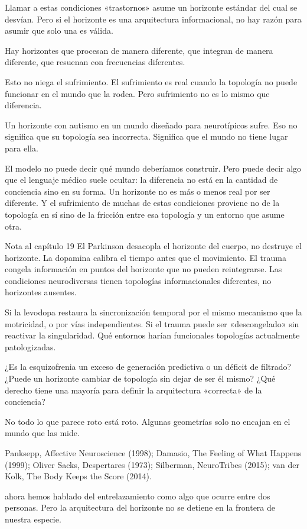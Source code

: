\noindent Llamar a estas condiciones «trastornos» asume un horizonte estándar del cual se desvían. Pero si el horizonte es una arquitectura informacional, no hay razón para asumir que solo una es válida.

Hay horizontes que procesan de manera diferente, que integran de manera diferente, que resuenan con frecuencias diferentes.

Esto no niega el sufrimiento. El sufrimiento es real cuando la topología no puede funcionar en el mundo que la rodea. Pero sufrimiento no es lo mismo que diferencia.

Un horizonte con autismo en un mundo diseñado para neurotípicos sufre. Eso no significa que su topología sea incorrecta. Significa que el mundo no tiene lugar para ella.

El modelo no puede decir qué mundo deberíamos construir. Pero puede decir algo que el lenguaje médico suele ocultar: la diferencia no está en la cantidad de conciencia sino en su forma. Un horizonte no es más o menos real por ser diferente. Y el sufrimiento de muchas de estas condiciones proviene no de la topología en sí sino de la fricción entre esa topología y un entorno que asume otra.

\begin{notacap}{Nota al capítulo 19}
 El Parkinson desacopla el horizonte del cuerpo, no destruye el horizonte. La dopamina calibra el tiempo antes que el movimiento. El trauma congela información en puntos del horizonte que no pueden reintegrarse. Las condiciones neurodiversas tienen topologías informacionales diferentes, no horizontes ausentes.

 Si la levodopa restaura la sincronización temporal por el mismo mecanismo que la motricidad, o por vías independientes. Si el trauma puede ser «descongelado» sin reactivar la singularidad. Qué entornos harían funcionales topologías actualmente patologizadas.

 ¿Es la esquizofrenia un exceso de generación predictiva o un déficit de filtrado? ¿Puede un horizonte cambiar de topología sin dejar de ser él mismo? ¿Qué derecho tiene una mayoría para definir la arquitectura «correcta» de la conciencia?

 No todo lo que parece roto está roto. Algunas geometrías solo no encajan en el mundo que las mide.

 Panksepp, Affective Neuroscience (1998); Damasio, The Feeling of What Happens (1999); Oliver Sacks, Despertares (1973); Silberman, NeuroTribes (2015); van der Kolk, The Body Keeps the Score (2014).
\end{notacap}
\noindent {} ahora hemos hablado del entrelazamiento como algo que ocurre entre dos personas. Pero la arquitectura del horizonte no se detiene en la frontera de nuestra especie.

